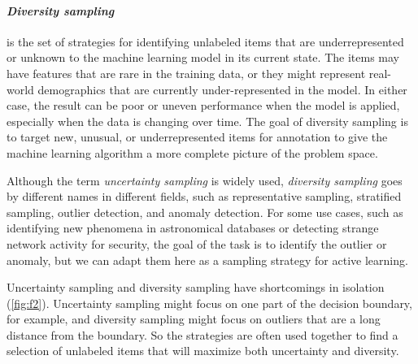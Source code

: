 \documentclass[sigconf,nonacm,screen,pbalance]{acmart}
\begin{document}
\paragraph{\bf\em Diversity sampling}
is the set of strategies for identifying unlabeled items that are
underrepresented or unknown to the machine learning model in its current state. The
items may have features that are rare in the training data, or they might represent
real-world demographics that are currently under-represented in the model. In either
case, the result can be poor or uneven performance when the model is applied, especially
when the data is changing over time. The goal of diversity sampling is to target new,
unusual, or underrepresented items for annotation to give the machine learning algorithm
a more complete picture of the problem space.

Although
the term \emph{uncertainty sampling} is widely used, \emph{diversity sampling} goes by
different names in different fields, such as representative sampling, stratified
sampling, outlier detection, and anomaly detection. For some use cases, such as
identifying new phenomena in astronomical databases or detecting strange network
activity for security, the goal of the task is to identify the outlier or anomaly, but
we can adapt them here as a sampling strategy for active learning.

Uncertainty
sampling and diversity sampling have shortcomings in isolation (\autoref{fig:f2}). Uncertainty
sampling might focus on one part of the decision boundary, for example, and diversity
sampling might focus on outliers that are a long distance from the boundary. So the
strategies are often used together to find a selection of unlabeled items that will
maximize both uncertainty and diversity.
\end{document}
